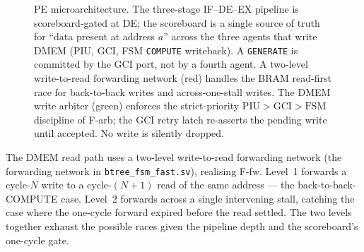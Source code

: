 \documentclass[journal,10pt]{IEEEtran}
\theoremstyle{plain}
\theoremstyle{definition}
\theoremstyle{remark}
\newcommand{\sv}[1]{\texttt{#1}}
\begin{document}
\begin{figure}[!t]
{%
} %
\caption{PE microarchitecture. The three-stage IF--DE--EX pipeline is
  scoreboard-gated at DE; the scoreboard is a single source of truth for
  ``data present at address $a$'' across the three agents that write DMEM
  (PIU, GCI, FSM \texttt{COMPUTE} writeback). A \texttt{GENERATE} is
  committed by the GCI port, not by a fourth agent. A two-level write-to-read
  forwarding network (red) handles the BRAM read-first race for
  back-to-back writes and across-one-stall writes. The DMEM write arbiter
  (green) enforces the strict-priority $\mathrm{PIU} > \mathrm{GCI} >
  \mathrm{FSM}$ discipline of \textsf{F-arb}; the GCI retry latch
  re-asserts the pending write until accepted. No write is silently
  dropped.}
\label{fig:pipeline}
\end{figure}
The DMEM read path uses a two-level write-to-read forwarding network
(the forwarding network in \sv{btree\_fsm\_fast.sv}), realising \textsf{F-fw}. Level~1
forwards a cycle-$N$ write to a cycle-$(N{+}1)$ read of the same address
--- the back-to-back-COMPUTE case. Level~2 forwards across a single
intervening stall, catching the case where the one-cycle forward expired
before the read settled. The two levels together exhaust the possible
races given the pipeline depth and the scoreboard's one-cycle gate.
\end{document}
